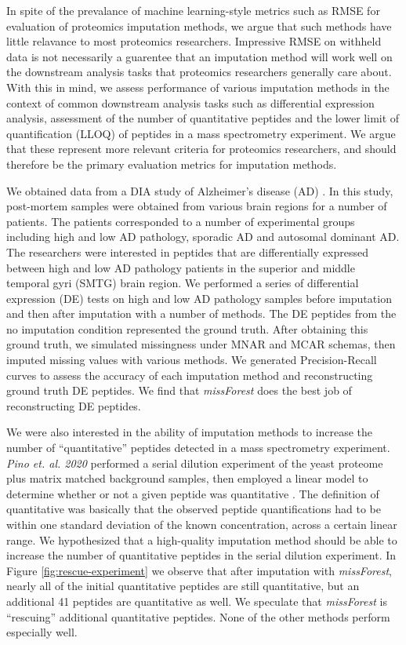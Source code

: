 \documentclass{article}
\begin{document}
In spite of the prevalance of machine learning-style metrics such as RMSE for evaluation of proteomics imputation methods, we argue that such methods have little relavance to most proteomics researchers. Impressive RMSE on withheld data is not necessarily a guarentee that an imputation method will work well on the downstream analysis tasks that proteomics researchers generally care about. With this in mind, we assess performance of various imputation methods in the context of common downstream analysis tasks such as differential expression analysis, assessment of the number of quantitative peptides and the lower limit of quantification (LLOQ) of peptides in a mass spectrometry experiment. We argue that these represent more relevant criteria for proteomics researchers, and should therefore be the primary evaluation metrics for imputation methods. 

We obtained data from a DIA study of Alzheimer's disease (AD) \cite{smtg-maccoss}. In this study, post-mortem samples were obtained from various brain regions for a number of patients. The patients corresponded to a number of experimental groups including high and low AD pathology, sporadic AD and autosomal dominant AD. The researchers were interested in peptides that are differentially expressed between high and low AD pathology patients in the superior and middle temporal gyri (SMTG) brain region. We performed a series of differential expression (DE) tests on high and low AD pathology samples before imputation and then after imputation with a number of methods. The DE peptides from the no imputation condition represented the ground truth. After obtaining this ground truth, we simulated missingness under MNAR and MCAR schemas, then imputed missing values with various methods. We generated Precision-Recall curves to assess the accuracy of each imputation method and reconstructing ground truth DE peptides. We find that \textit{missForest} does the best job of reconstructing DE peptides. 

We were also interested in the ability of imputation methods to increase the number of ``quantitative'' peptides detected in a mass spectrometry experiment. \textit{Pino et. al. 2020} performed a serial dilution experiment of the yeast proteome plus matrix matched background samples, then employed a linear model to determine whether or not a given peptide was quantitative \cite{matrix-matched-calib}. The definition of quantitative was basically that the observed peptide quantifications had to be within one standard deviation of the known concentration, across a certain linear range. We hypothesized that a high-quality imputation method should be able to increase the number of quantitative peptides in the serial dilution experiment. In Figure \ref{fig:rescue-experiment} we observe that after imputation with \textit{missForest}, nearly all of the initial quantitative peptides are still quantitative, but an additional 41 peptides are quantitative as well. We speculate that \textit{missForest} is ``rescuing'' additional quantitative peptides. None of the other methods perform especially well. 
\end{document}
